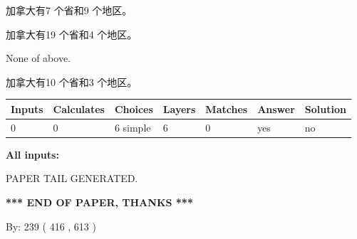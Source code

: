 \documentclass{ctexart}
\begin{document}
 
加拿大有7 个省和9 个地区。
 
 
加拿大有19 个省和4 个地区。
 
 
 None of above.
 
 
\noindent{}
 
 
加拿大有10 个省和3 个地区。
 
 
\noindent{}
 
 
   
   
   
   
\noindent\begin{tabular}{|l|l|l|l|l|l|l|}
 \hline
Inputs & Calculates & Choices & Layers & Matches & Answer & Solution \\ \hline
 0  & 
 0  & 
 6
  simple  
  & 
 6  & 
 0  & 
  yes & 
  no 
  \\ \hline
 \end{tabular}
   
   
   
   
\noindent{}
   
   
   
   
\noindent\vspace{0.1in}\hspace{-0.08in} {\textbf{\Large{All inputs: }}}
   
   
   
   
   
   
 \vspace{0.2in}
 
   
   
\vspace{2.0in} PAPER TAIL GENERATED.
   
   
   
   
\vspace{1.0in} 
{\textbf{\large{ *** END OF PAPER, THANKS *** }}} 
   
   
\hspace{1.0in} By: 
 239 ( 416 ,  613 )
   
   
   
   
\newpage 
\setcounter{page}{ 
   423001 } 
   
   
   
\end{document}
